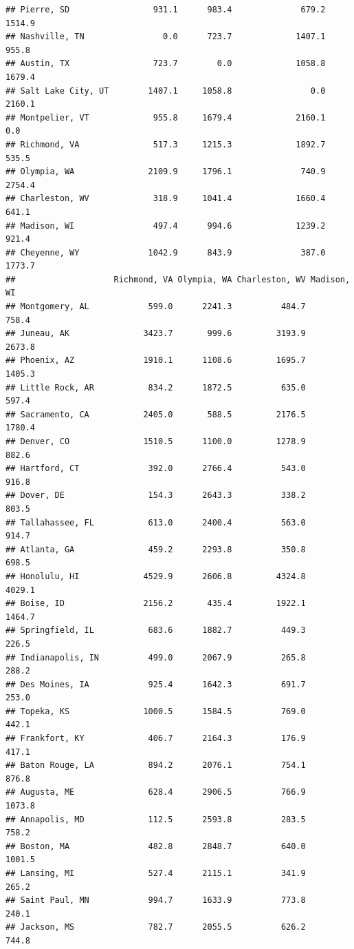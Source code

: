 \documentclass[
]{article}
\begin{document}
\begin{verbatim}
## Pierre, SD                 931.1      983.4              679.2         1514.9
## Nashville, TN                0.0      723.7             1407.1          955.8
## Austin, TX                 723.7        0.0             1058.8         1679.4
## Salt Lake City, UT        1407.1     1058.8                0.0         2160.1
## Montpelier, VT             955.8     1679.4             2160.1            0.0
## Richmond, VA               517.3     1215.3             1892.7          535.5
## Olympia, WA               2109.9     1796.1              740.9         2754.4
## Charleston, WV             318.9     1041.4             1660.4          641.1
## Madison, WI                497.4      994.6             1239.2          921.4
## Cheyenne, WY              1042.9      843.9              387.0         1773.7
##                    Richmond, VA Olympia, WA Charleston, WV Madison, WI
## Montgomery, AL            599.0      2241.3          484.7       758.4
## Juneau, AK               3423.7       999.6         3193.9      2673.8
## Phoenix, AZ              1910.1      1108.6         1695.7      1405.3
## Little Rock, AR           834.2      1872.5          635.0       597.4
## Sacramento, CA           2405.0       588.5         2176.5      1780.4
## Denver, CO               1510.5      1100.0         1278.9       882.6
## Hartford, CT              392.0      2766.4          543.0       916.8
## Dover, DE                 154.3      2643.3          338.2       803.5
## Tallahassee, FL           613.0      2400.4          563.0       914.7
## Atlanta, GA               459.2      2293.8          350.8       698.5
## Honolulu, HI             4529.9      2606.8         4324.8      4029.1
## Boise, ID                2156.2       435.4         1922.1      1464.7
## Springfield, IL           683.6      1882.7          449.3       226.5
## Indianapolis, IN          499.0      2067.9          265.8       288.2
## Des Moines, IA            925.4      1642.3          691.7       253.0
## Topeka, KS               1000.5      1584.5          769.0       442.1
## Frankfort, KY             406.7      2164.3          176.9       417.1
## Baton Rouge, LA           894.2      2076.1          754.1       876.8
## Augusta, ME               628.4      2906.5          766.9      1073.8
## Annapolis, MD             112.5      2593.8          283.5       758.2
## Boston, MA                482.8      2848.7          640.0      1001.5
## Lansing, MI               527.4      2115.1          341.9       265.2
## Saint Paul, MN            994.7      1633.9          773.8       240.1
## Jackson, MS               782.7      2055.5          626.2       744.8

\end{verbatim}
\end{document}
